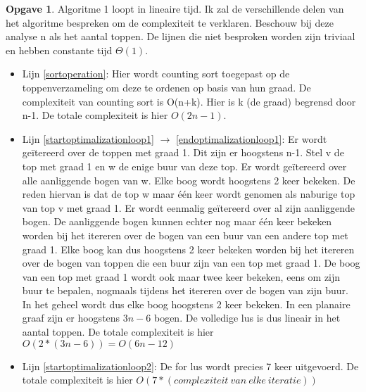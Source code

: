 \documentclass[11pt, a4paper, table]{article}
\theoremstyle{definition}
\newtheorem{opgave}{Opgave}
\begin{document}
\begin{opgave}
		Algoritme 1 loopt in lineaire tijd. Ik zal de verschillende delen van het algoritme bespreken om de complexiteit te verklaren. Beschouw bij deze analyse n als het aantal toppen. De lijnen die niet besproken worden zijn triviaal en hebben constante tijd $\Theta(1)$.
		\begin{itemize}
			 \item Lijn \ref{sortoperation}: Hier wordt counting sort toegepast op de toppenverzameling om deze te ordenen op basis van hun graad. De complexiteit van counting sort is O(n+k). Hier is k (de graad) begrensd door n-1. De totale complexiteit is hier $O(2n-1)$.
			 \item Lijn \ref{startoptimalizationloop1} $\rightarrow$ \ref{endoptimalizationloop1}: Er wordt ge\"{i}tereerd over de toppen met graad 1. Dit zijn er hoogstens n-1. Stel v de top met graad 1 en w de enige buur van deze top. 
			 Er wordt ge\"{i}tereerd over alle aanliggende bogen van w. Elke boog wordt hoogstens 2 keer bekeken. De reden hiervan is dat de top w maar \'{e}\'{e}n keer wordt genomen als naburige top van top v met graad 1. Er wordt eenmalig ge\"{i}tereerd over al zijn aanliggende bogen. De aanliggende bogen kunnen echter nog maar \'{e}\'{e}n keer bekeken worden bij het itereren over de bogen van een buur van een andere top met graad 1. 
			 Elke boog kan dus hoogstens 2 keer bekeken worden bij het itereren over de bogen van toppen die een buur zijn van een top met graad 1. De boog van een top met graad 1 wordt ook maar twee keer bekeken, eens om zijn buur te bepalen, nogmaals tijdens het itereren over de bogen van zijn buur. In het geheel wordt dus elke boog hoogstens 2 keer bekeken. 
			 In een planaire graaf zijn er hoogstens $3n-6$ bogen. De volledige lus is dus lineair in het aantal toppen. De totale complexiteit is hier $O(2*(3n-6)) = O(6n-12)$
			\item Lijn \ref{startoptimalizationloop2}: De for lus wordt precies 7 keer uitgevoerd. De totale complexiteit is hier 
			$O(7*(complexiteit\ van\ elke\ iteratie))$

\end{itemize}
\end{opgave}
\end{document}
